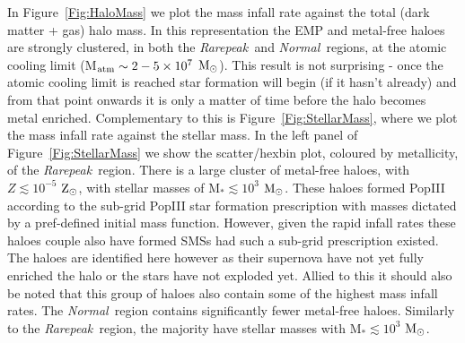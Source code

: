 \documentclass[graphics, twocolumn, usenatbib]{mn2e}
\newcommand{\msolarc} {$\rm{M_{\odot}}$}
\newcommand{\zsolarc} {$\rm{Z_{\odot}}$}
\newcommand{\rarepeak} {\textit{Rarepeak~}}
\newcommand{\normal} {\textit{Normal~}}
\begin{document}
In Figure~\ref{Fig:HaloMass} we plot the mass infall rate against the total (dark matter
+ gas) halo mass. In this representation the EMP and metal-free haloes are strongly clustered, in both
the \rarepeak and \normal regions, at the atomic cooling limit (M$_{\rm atm} \sim 2 - 5 \times 10^7$
\msolarc). This result is not surprising - once the atomic cooling limit is reached star formation
will begin (if it hasn't already) and from that point onwards it is only a matter of time before
the halo becomes metal enriched. Complementary to this is Figure~\ref{Fig:StellarMass}, 
where we plot the mass infall rate against the stellar mass. In the left panel of Figure~\ref{Fig:StellarMass} we show the scatter/hexbin plot, coloured by metallicity, of the
\rarepeak region. There is a large cluster of metal-free haloes, with $Z \lesssim 10^{-5}$ \zsolarc,
with stellar masses of M$_{*} \lesssim 10^3$ \msolarc. These haloes formed PopIII
according to the sub-grid PopIII star formation prescription with masses dictated 
by a pref-defined initial mass function. However, given the rapid infall rates these 
haloes couple also have formed SMSs had such a sub-grid prescription existed. The
haloes are identified here however as their supernova have not yet fully enriched the 
halo or the stars have not exploded yet. Allied to this 
it should also be noted that this group of haloes also contain some of the highest mass infall
rates. The \normal region contains significantly fewer metal-free haloes.
Similarly to the \rarepeak region, the majority have stellar masses
with M$_{*} \lesssim 10^3$ \msolarc.  
\end{document}
